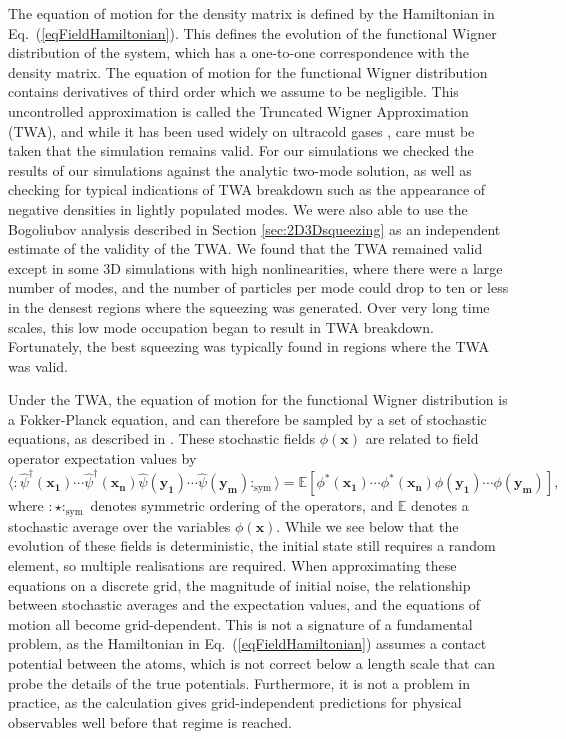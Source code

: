 \documentclass{iopart}
\begin{document}
The equation of motion for the density matrix is defined by the Hamiltonian in Eq.~(\ref{eqFieldHamiltonian}).  This defines the evolution of the functional Wigner distribution of the system, which has a one-to-one correspondence with the density matrix.  The equation of motion for the functional Wigner distribution contains derivatives of third order which we assume to be negligible.  This uncontrolled approximation is called the Truncated Wigner Approximation (TWA), and while it has been used widely on ultracold gases \cite{johnssonET2007,haineET2009,steelET1998,dennisET2010,johnssonHope:2007}, care must be taken that the simulation remains valid. For our simulations we checked the results of our simulations against the analytic two-mode solution, as well as checking for typical indications of TWA breakdown such as the appearance of negative densities in lightly populated modes.  We were also able to use the Bogoliubov analysis described in Section \ref{sec:2D3Dsqueezing} as an independent estimate of the validity of the TWA.  We found that the TWA remained valid except in some 3D simulations with high nonlinearities, where there were a large number of modes, and the number of particles per mode could drop to ten or less in the densest regions where the squeezing was generated. Over very long time scales, this low mode occupation began to result in TWA breakdown.  Fortunately, the best squeezing was typically found in regions where the TWA was valid.

Under the TWA, the equation of motion for the functional Wigner distribution is a Fokker-Planck equation, and can therefore be sampled by a set of stochastic equations, as described in \cite{gardiner1991}.  These stochastic fields $\phi(\mathbf{x})$ are related to field operator expectation values by  
\begin{equation}
\langle :\hat{\psi}^\dagger(\mathbf{x_1})\cdots\hat{\psi}^\dagger(\mathbf{x_n})\hat{\psi}(\mathbf{y_1})\cdots\hat{\psi}(\mathbf{y_m}):_{\mbox{sym}}\rangle = \mathbb{E}\left[\phi^*(\mathbf{x_1})\cdots\phi^*(\mathbf{x_n})\phi(\mathbf{y_1})\cdots\phi(\mathbf{y_m})\right],
\label{eqExpectationRelations}
\end{equation}
%
where $:\star:_{\mbox{sym}}$ denotes symmetric ordering of the operators, and $\mathbb{E}$ denotes a stochastic average over the variables $\phi(\mathbf{x})$.  While we see below that the evolution of these fields is deterministic, the initial state still requires a random element, so multiple realisations are required.  When approximating these equations on a discrete grid, the magnitude of initial noise, the relationship between stochastic averages and the expectation values, and the equations of motion all become grid-dependent.  This is not a signature of a fundamental problem, as the Hamiltonian in Eq.~(\ref{eqFieldHamiltonian}) assumes a contact potential between the atoms, which is not correct below a length scale that can probe the details of the true potentials.  Furthermore, it is not a problem in practice, as the calculation gives grid-independent predictions for physical observables well before that regime is reached.
\end{document}

